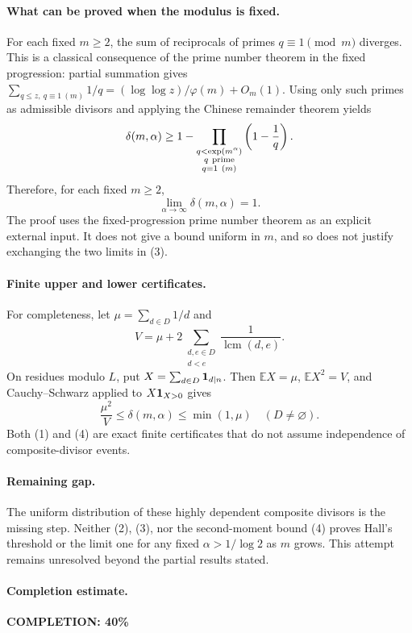 \paragraph{What can be proved when the modulus is fixed.}
For each fixed \(m\geq2\), the sum of reciprocals of primes
\(q\equiv1\pmod m\) diverges. This is a classical consequence
of the prime number theorem in the fixed progression:
partial summation gives
\(\sum_{q\leq z,\ q\equiv1\ (m)}1/q
  =(\log\log z)/\varphi(m)+O_m(1)\).
Using only such primes as admissible divisors and applying
the Chinese remainder theorem yields
\[
 \delta(m,\alpha)\geq
 1-\prod_{\substack{q<\exp(m^\alpha)\\q\ {\rm prime}\\q\equiv1\ (m)}}
       \left(1-\frac1q\right).
\]
Therefore, for each fixed \(m\geq2\),
\[
 \lim_{\alpha\to\infty}\delta(m,\alpha)=1.                       \tag{3}
\]
The proof uses the fixed-progression prime number theorem
as an explicit external input.
It does not give a bound uniform in \(m\), and so does not
justify exchanging the two limits in (3).

\paragraph{Finite upper and lower certificates.}
For completeness, let
\(\mu=\sum_{d\in D}1/d\) and
\[
 V=\mu+2\sum_{\substack{d,e\in D\\d<e}}\frac1{\operatorname{lcm}(d,e)}.
\]
On residues modulo \(L\), put \(X=\sum_{d\in D}{\bf1}_{d\mid n}\).
Then \(\mathbb EX=\mu\), \(\mathbb EX^2=V\), and Cauchy--Schwarz
applied to \(X{\bf1}_{X>0}\) gives
\[
 \frac{\mu^2}{V}\leq\delta(m,\alpha)\leq\min(1,\mu)
 \quad(D\ne\varnothing).                                      \tag{4}
\]
Both (1) and (4) are exact finite certificates that do not
assume independence of composite-divisor events.

\paragraph{Remaining gap.}
The uniform distribution of these highly dependent composite
divisors is the missing step. Neither (2), (3), nor the
second-moment bound (4) proves Hall's threshold or the limit
one for any fixed \(\alpha>1/\log2\) as \(m\) grows.
This attempt remains unresolved beyond the partial results stated.

\paragraph{Completion estimate.}
\textbf{COMPLETION: 40\%}

